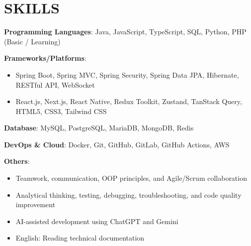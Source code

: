 \section{SKILLS}
\resumeSubHeadingListStart

  \item
    \resumeItemListStart
      \item \textbf{Programming Languages}: Java, JavaScript, TypeScript, SQL, Python, PHP (Basic / Learning)
      \item \textbf{Frameworks/Platforms}:
        \begin{itemize}
          \item Spring Boot, Spring MVC, Spring Security, Spring Data JPA, Hibernate, RESTful API, WebSocket
          \item React.js, Next.js, React Native, Redux Toolkit, Zustand, TanStack Query, HTML5, CSS3, Tailwind CSS
        \end{itemize}
      \item \textbf{Database}: MySQL, PostgreSQL, MariaDB, MongoDB, Redis
      \item \textbf{DevOps \& Cloud}: Docker, Git, GitHub, GitLab, GitHub Actions, AWS
      \item \textbf{Others}:
        \begin{itemize}
          \item Teamwork, communication, OOP principles, and Agile/Scrum collaboration
          \item Analytical thinking, testing, debugging, troubleshooting, and code quality improvement
          \item AI-assisted development using ChatGPT and Gemini
          \item English: Reading technical documentation
        \end{itemize}
    \resumeItemListEnd

\resumeSubHeadingListEnd
